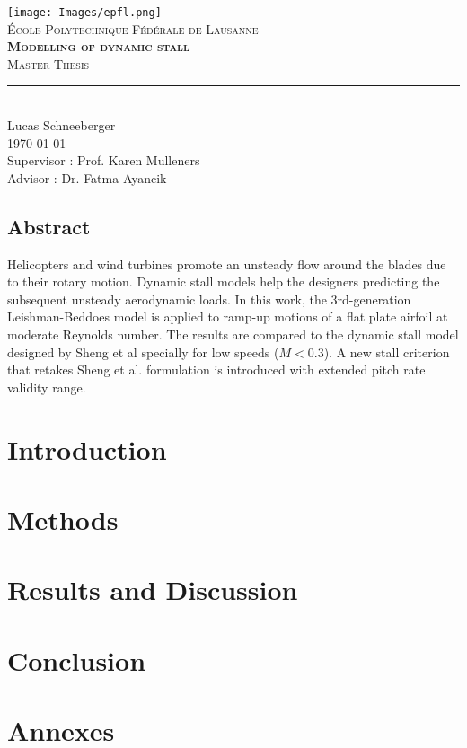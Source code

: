 \documentclass[11pt]{report}
\begin{document}
\begin{titlepage}
	\centering
    \texttt{[image: Images/epfl.png]}\\[0.25cm] 	%
    \textsc{\LARGE École Polytechnique Fédérale de Lausanne}\\ \vspace{\fill}
    \textbf{\textsc{\fontsize{28}{50}\selectfont Modelling of dynamic stall}}\\ \vspace{\fill}		
	\textsc{\LARGE Master Thesis}\\[0.4cm]
	\rule{\linewidth}{0.2 mm} \\[0.5 cm]
    Lucas Schneeberger \\[2cm] \today \\
    Supervisor : Prof. Karen Mulleners \\
    Advisor : Dr. Fatma Ayancik
\end{titlepage}
\restoregeometry

\thispagestyle{numberonly}

\begin{summary}
\section*{Abstract}
Helicopters and wind turbines promote an unsteady flow around the blades due to their rotary motion. Dynamic stall models help the designers predicting the subsequent unsteady aerodynamic loads. In this work, the 3rd-generation Leishman-Beddoes  model is applied to ramp-up motions of a flat plate airfoil at moderate Reynolds number. The results are compared to the dynamic stall model designed by Sheng et al specially for low speeds ($M<0.3$). A new stall criterion that retakes Sheng et al. formulation is introduced with extended pitch rate validity range. 
\end{summary}

\tableofcontents

\chapter{Introduction}


\chapter{Methods}


\chapter{Results and Discussion}


\chapter{Conclusion}


\printnomenclature


 


\chapter{Annexes}

\end{document}
